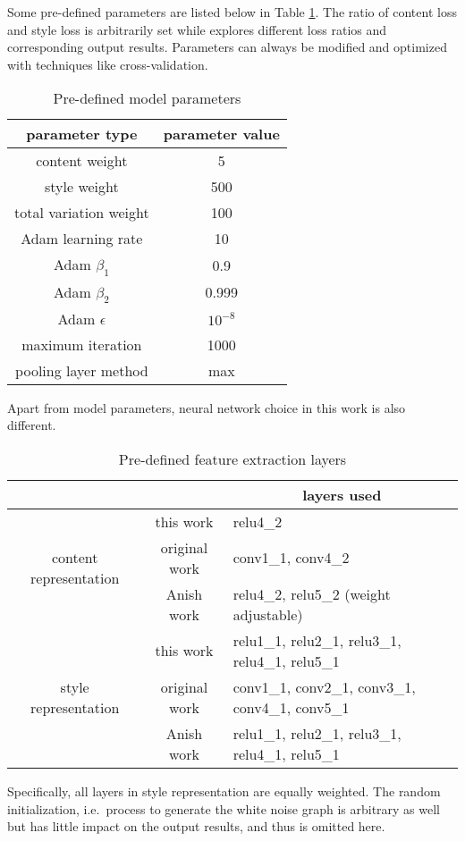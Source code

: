 Some pre-defined parameters are listed below in Table \ref{table:parameters}.
The ratio of content loss and style loss is arbitrarily set while \cite{Gatys:2016gj}
explores different loss ratios and corresponding output results.
Parameters can always be modified and optimized with techniques like cross-validation.

	\begin{table}[!htb]
	\center
	\begin{tabular}{c|c}
	\hline
	parameter type & parameter value \\ \hline
	content weight & 5 \\
	style weight & 500 \\
	total variation weight & 100 \\
	Adam learning rate & 10 \\
	Adam $\beta_1$ & 0.9 \\
	Adam $\beta_2$ & 0.999 \\
	Adam $\epsilon$ & $10^{-8}$ \\
	maximum iteration & 1000 \\
	pooling layer method & max \\
	\hline
	\end{tabular}
	\caption{Pre-defined model parameters}
	\label{table:parameters}
	\end{table}

Apart from model parameters, neural network choice in this work is also different.
	
	\begin{table}[!htb]
	\center
	\begin{tabular}{c|c|l}
	\hline
	& & \multicolumn{1}{c}{layers used} \\ \hline
	\multirow{3}{*}{content representation}
		& this work & relu4\_2 \\
	& original work & conv1\_1, conv4\_2 \\
	& Anish work & relu4\_2, relu5\_2 (weight adjustable) \\ \hline
	\multirow{3}{*}{style representation}
		& this work & relu1\_1, relu2\_1, relu3\_1, relu4\_1, relu5\_1 \\
	& original work & conv1\_1, conv2\_1, conv3\_1, conv4\_1, conv5\_1 \\
	& Anish work & relu1\_1, relu2\_1, relu3\_1, relu4\_1, relu5\_1 \\
	\hline
	\end{tabular}
	\caption{Pre-defined feature extraction layers}
	\label{table:layers}
	\end{table}

Specifically, all layers in style representation are equally weighted.
The random initialization, i.e.\ process to generate the white noise graph
is arbitrary as well but has little impact on the output results,
and thus is omitted here.
